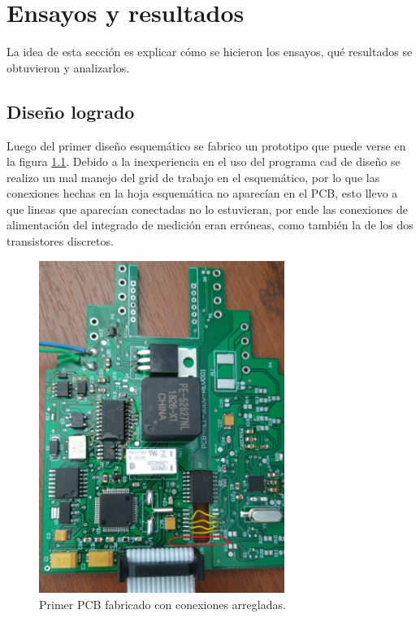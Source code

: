 
\chapter{Ensayos y resultados} %
\label{Chapter4} %

La idea de esta sección es explicar cómo se hicieron los ensayos, qué resultados se obtuvieron y analizarlos.


\section{Diseño logrado}

Luego del primer diseño esquemático se fabrico un prototipo que puede verse en la figura  \ref{fig:proto1}. Debido a la inexperiencia en el uso del programa cad de diseño se realizo un mal manejo del grid de trabajo en el esquemático, por lo que las conexiones hechas en la hoja esquemática no aparecían en el PCB, esto llevo a que lineas que aparecían conectadas no lo estuvieran, por ende las conexiones de alimentación del integrado de medición eran erróneas, como también la de los dos transistores discretos.

\begin{figure}[!htb]
	\centering
	\includegraphics[width=80mm,keepaspectratio]{Figures/placaarmada1.jpeg}
	\caption{Primer PCB fabricado con conexiones arregladas.}
	\label{fig:proto1}
\end{figure}

